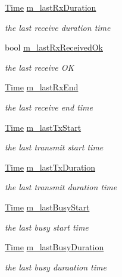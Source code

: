 \begin{DoxyCompactItemize}
\hyperlink{classns3_1_1Time}{Time} \hyperlink{classns3_1_1DcfManager_ab43fe243e604d9b329ccffdfbbba6499}{m\+\_\+last\+Rx\+Duration}
\begin{DoxyCompactList}\small\item\em the last receive duration time \end{DoxyCompactList}\item 
bool \hyperlink{classns3_1_1DcfManager_ac94f6ec6413a342a8aa2119421ed131f}{m\+\_\+last\+Rx\+Received\+Ok}
\begin{DoxyCompactList}\small\item\em the last receive OK \end{DoxyCompactList}\item 
\hyperlink{classns3_1_1Time}{Time} \hyperlink{classns3_1_1DcfManager_aeb45605e9f45e17ec4dac9e7a5e99430}{m\+\_\+last\+Rx\+End}
\begin{DoxyCompactList}\small\item\em the last receive end time \end{DoxyCompactList}\item 
\hyperlink{classns3_1_1Time}{Time} \hyperlink{classns3_1_1DcfManager_abaae67a660545bd187548f4cc349b8fd}{m\+\_\+last\+Tx\+Start}
\begin{DoxyCompactList}\small\item\em the last transmit start time \end{DoxyCompactList}\item 
\hyperlink{classns3_1_1Time}{Time} \hyperlink{classns3_1_1DcfManager_ac64d741d745e0cc4930e58a0cee5be31}{m\+\_\+last\+Tx\+Duration}
\begin{DoxyCompactList}\small\item\em the last transmit duration time \end{DoxyCompactList}\item 
\hyperlink{classns3_1_1Time}{Time} \hyperlink{classns3_1_1DcfManager_a0f8af7e80b542ad84de4f9275e41806b}{m\+\_\+last\+Busy\+Start}
\begin{DoxyCompactList}\small\item\em the last busy start time \end{DoxyCompactList}\item 
\hyperlink{classns3_1_1Time}{Time} \hyperlink{classns3_1_1DcfManager_adb6bad3b77a9c74b3c0e206ddcce066b}{m\+\_\+last\+Busy\+Duration}
\begin{DoxyCompactList}\small\item\em the last busy duraation time \end{DoxyCompactList}\item 

\end{DoxyCompactItemize}
